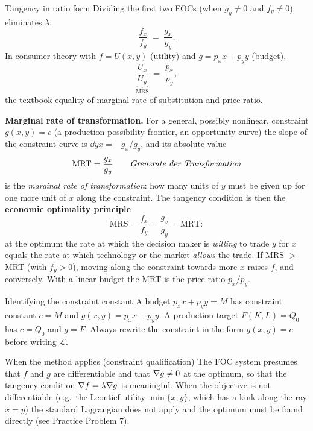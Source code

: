 \begin{rulebox}{Tangency in ratio form}
Dividing the first two FOCs (when $g_y \neq 0$ and $f_y \neq 0$) eliminates
$\lambda$:
\[
\frac{f_x}{f_y} \;=\; \frac{g_x}{g_y}.
\]
In consumer theory with $f = U(x, y)$ (utility) and $g = p_x x + p_y y$
(budget),
\[
\underbrace{\frac{U_x}{U_y}}_{\text{MRS}} \;=\; \frac{p_x}{p_y},
\]
the textbook equality of marginal rate of substitution and price ratio.

\textbf{Marginal rate of transformation.} For a general, possibly
nonlinear, constraint $g(x,y)=c$ (a production possibility frontier, an
opportunity curve) the slope of the constraint curve is
$\dd{y}{x}=-g_x/g_y$, and its absolute value
\[
  \text{MRT}=\frac{g_x}{g_y}
  \qquad\text{\emph{Grenzrate der Transformation}}
\]
is the \emph{marginal rate of transformation}: how many units of $y$ must
be given up for one more unit of $x$ along the constraint. The tangency
condition is then the \textbf{economic optimality principle}
\[
  \text{MRS}=\frac{f_x}{f_y}=\frac{g_x}{g_y}=\text{MRT}:
\]
at the optimum the rate at which the decision maker is \emph{willing} to
trade $y$ for $x$ equals the rate at which technology or the market
\emph{allows} the trade. If MRS $>$ MRT (with $f_y>0$), moving along
the constraint towards more $x$ raises $f$, and conversely. With a linear budget the MRT
is the price ratio $p_x/p_y$.
\end{rulebox}

\begin{rulebox}{Identifying the constraint constant}
A budget $p_x x + p_y y = M$ has constraint constant $c = M$ and
$g(x,y) = p_x x + p_y y$. A production target $F(K, L) = Q_0$ has $c = Q_0$
and $g = F$. Always rewrite the constraint in the form $g(x,y) = c$ before
writing $\mathcal{L}$.
\end{rulebox}

\begin{rulebox}{When the method applies (constraint qualification)}
The FOC system presumes that $f$ and $g$ are differentiable and that
$\nabla g \neq 0$ at the optimum, so that the tangency condition
$\nabla f = \lambda \nabla g$ is meaningful. When the objective is not
differentiable (e.g.\ the Leontief utility $\min\{x, y\}$, which has a
kink along the ray $x = y$) the standard Lagrangian does not apply and
the optimum must be found directly (see Practice Problem 7).
\end{rulebox}

